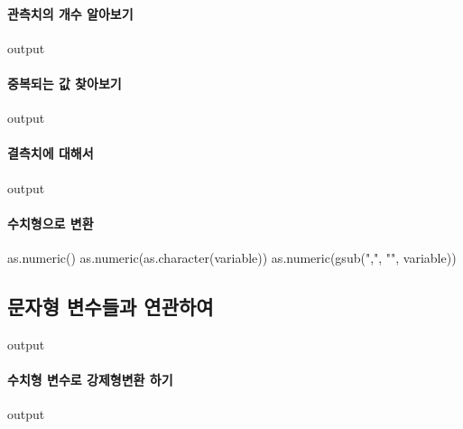 \documentclass{report}
\begin{document}
\paragraph{관측치의 개수 알아보기}

\begin{Schunk}
\begin{Soutput}
output
\end{Soutput}
\end{Schunk}

\paragraph{중복되는 값 찾아보기}
\begin{Schunk}
\begin{Soutput}
output
\end{Soutput}
\end{Schunk}

\paragraph{결측치에 대해서}
\begin{Schunk}
\begin{Soutput}
output
\end{Soutput}
\end{Schunk}

\paragraph{수치형으로 변환}

\begin{Schunk}
\begin{Soutput}
as.numeric()
as.numeric(as.character(variable))
as.numeric(gsub(",", "", variable))
\end{Soutput}
\end{Schunk}



\subsection{문자형 변수들과 연관하여}

\begin{Schunk}
\begin{Soutput}
output
\end{Soutput}
\end{Schunk}

\paragraph{수치형 변수로 강제형변환 하기}
\begin{Schunk}
\begin{Soutput}
output
\end{Soutput}
\end{Schunk}
\end{document}
